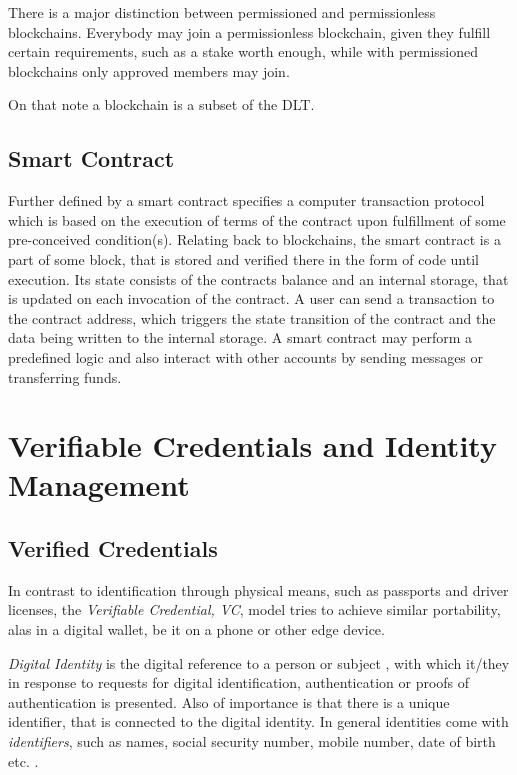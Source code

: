 There is a major distinction between permissioned and permissionless blockchains. Everybody may join a permissionless
blockchain, given they fulfill certain requirements, such as a stake worth enough, while with permissioned blockchains
only approved members may join. \cite{hyperledger:aries-rfc}

On that note a blockchain is a subset of the DLT. \cite{diam-iot-2020}

\subsection{Smart Contract} %
\label{sec:Smart Contract}
Further defined by \cite{diam-iot-2020} a smart contract specifies a computer transaction protocol which is based on the
execution of terms of the contract upon fulfillment of some pre-conceived condition(s).
Relating back to blockchains, the smart contract is a part of some block, that is stored and verified there in the form
of code until execution. Its state consists of the contracts balance and an internal storage, that is updated on each
invocation of the contract. A user can send a transaction to the contract address, which triggers the state transition
of the contract and the data being written to the internal storage. A smart contract may perform a predefined logic and
also interact with other accounts by sending messages or transferring funds.

\section{Verifiable Credentials and Identity Management} %
\label{sec:Verifiable Credentials and Identity Management}

\subsection{Verified Credentials} %
\label{sub:Verified Credentials}
In contrast to identification through physical means, such as passports and driver licenses, the
\textit{Verifiable Credential, VC}, model tries to achieve similar portability, alas in a digital wallet, be it on a
phone or other edge device. \cite{w3c2019verifiablecredentials}

\textit{Digital Identity} is the digital reference to a person or subject \cite{Domingo_2020}, with which it/they in
response to requests for digital identification, authentication or proofs of authentication is presented. Also of
importance is that there is a unique identifier, that is connected to the digital identity.
\cite{Sedlmeir_Smethurst_Rieger_Fridgen_2021}
In general identities come with \textit{identifiers}, such as names, social security number, mobile number, date of
birth etc. \cite{eth-decentralized-identity}.

